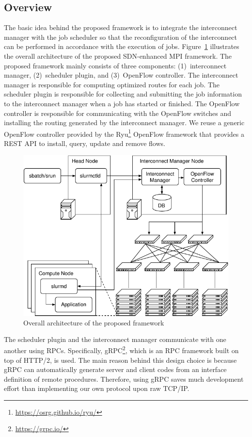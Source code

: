 \documentclass[graybox]{svmult}
\begin{document}
\subsection{Overview}

The basic idea behind the proposed framework is to integrate the interconnect
manager with the job scheduler so that the reconfiguration of the interconnect
can be performed in accordance with the execution of jobs.
Figure~\ref{kt:fig:architecture} illustrates the overall architecture of the
proposed SDN-enhanced MPI framework. The proposed framework mainly consists of
three components: (1)~interconnect manager, (2)~scheduler plugin, and
(3)~OpenFlow controller. The interconnect manager is responsible for computing
optimized routes  for each job. The scheduler plugin is responsible for
collecting and submitting the job information to the interconnect manager when
a job has started or finished. The OpenFlow controller is responsible for
communicating with the OpenFlow switches and installing the routing generated
by the interconnect manager. We reuse a generic OpenFlow controller provided
by the Ryu\footnote{\url{https://osrg.github.io/ryu/}} OpenFlow framework that
provides a REST API to install, query, update and remove flows.

\begin{figure}
    \centering
    \includegraphics{architecture}
    \caption{Overall architecture of the proposed framework}%
    \label{kt:fig:architecture}
\end{figure}

The scheduler plugin and the interconnect manager communicate with
one another using RPCs. Specifically, gRPC\footnote{\url{https://grpc.io/}}, which is an
RPC framework built on top of HTTP/2, is used. The main reason behind this
design choice is because gRPC can automatically generate server and client
codes from an interface definition of remote procedures. Therefore, using gRPC
saves much development effort than implementing our own protocol upon raw
TCP/IP\@.
\end{document}
